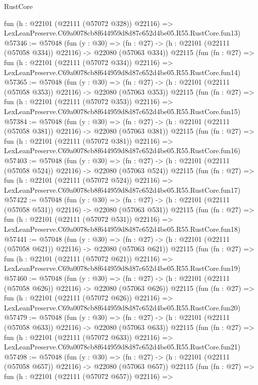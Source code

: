 \begin{lexlean}{RustCore}
\begin{coremodule}
    fun (h : @22101 (@22111 (@57072 @328)) @22116) =>
    LexLeanPreserve.C69a0078cb8f644959d8d87c652d4be05.R55.RustCore.fun13)
@57346 := @57048
    (fun (y : @30) =>
    (fn : @27) -> (h : @22101 (@22111 (@57058 @334)) @22116) -> @22080 (@57063 @334))
    @22115
    (fun (fn : @27) =>
    fun (h : @22101 (@22111 (@57072 @334)) @22116) =>
    LexLeanPreserve.C69a0078cb8f644959d8d87c652d4be05.R55.RustCore.fun14)
@57365 := @57048
    (fun (y : @30) =>
    (fn : @27) -> (h : @22101 (@22111 (@57058 @353)) @22116) -> @22080 (@57063 @353))
    @22115
    (fun (fn : @27) =>
    fun (h : @22101 (@22111 (@57072 @353)) @22116) =>
    LexLeanPreserve.C69a0078cb8f644959d8d87c652d4be05.R55.RustCore.fun15)
@57384 := @57048
    (fun (y : @30) =>
    (fn : @27) -> (h : @22101 (@22111 (@57058 @381)) @22116) -> @22080 (@57063 @381))
    @22115
    (fun (fn : @27) =>
    fun (h : @22101 (@22111 (@57072 @381)) @22116) =>
    LexLeanPreserve.C69a0078cb8f644959d8d87c652d4be05.R55.RustCore.fun16)
@57403 := @57048
    (fun (y : @30) =>
    (fn : @27) -> (h : @22101 (@22111 (@57058 @524)) @22116) -> @22080 (@57063 @524))
    @22115
    (fun (fn : @27) =>
    fun (h : @22101 (@22111 (@57072 @524)) @22116) =>
    LexLeanPreserve.C69a0078cb8f644959d8d87c652d4be05.R55.RustCore.fun17)
@57422 := @57048
    (fun (y : @30) =>
    (fn : @27) -> (h : @22101 (@22111 (@57058 @531)) @22116) -> @22080 (@57063 @531))
    @22115
    (fun (fn : @27) =>
    fun (h : @22101 (@22111 (@57072 @531)) @22116) =>
    LexLeanPreserve.C69a0078cb8f644959d8d87c652d4be05.R55.RustCore.fun18)
@57441 := @57048
    (fun (y : @30) =>
    (fn : @27) -> (h : @22101 (@22111 (@57058 @621)) @22116) -> @22080 (@57063 @621))
    @22115
    (fun (fn : @27) =>
    fun (h : @22101 (@22111 (@57072 @621)) @22116) =>
    LexLeanPreserve.C69a0078cb8f644959d8d87c652d4be05.R55.RustCore.fun19)
@57460 := @57048
    (fun (y : @30) =>
    (fn : @27) -> (h : @22101 (@22111 (@57058 @626)) @22116) -> @22080 (@57063 @626))
    @22115
    (fun (fn : @27) =>
    fun (h : @22101 (@22111 (@57072 @626)) @22116) =>
    LexLeanPreserve.C69a0078cb8f644959d8d87c652d4be05.R55.RustCore.fun20)
@57479 := @57048
    (fun (y : @30) =>
    (fn : @27) -> (h : @22101 (@22111 (@57058 @633)) @22116) -> @22080 (@57063 @633))
    @22115
    (fun (fn : @27) =>
    fun (h : @22101 (@22111 (@57072 @633)) @22116) =>
    LexLeanPreserve.C69a0078cb8f644959d8d87c652d4be05.R55.RustCore.fun21)
@57498 := @57048
    (fun (y : @30) =>
    (fn : @27) -> (h : @22101 (@22111 (@57058 @657)) @22116) -> @22080 (@57063 @657))
    @22115
    (fun (fn : @27) =>
    fun (h : @22101 (@22111 (@57072 @657)) @22116) =>

\end{coremodule}
\end{lexlean}
